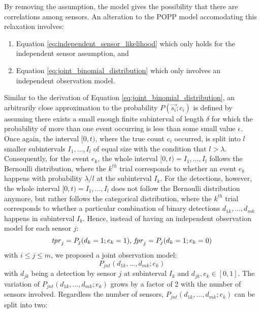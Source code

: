 By removing the assumption, the model gives the possibility that there are correlations among sensors. An alteration to the POPP model accomodating this relaxation involves:
\begin{enumerate}
    \item Equation \ref{eq:independent_sensor_likelihood} which only holds for the independent sensor assumption, and
    \item Equation \ref{eq:joint_binomial_distribution} which only involves an independent observation model.
\end{enumerate}

Similar to the derivation of Equation \ref{eq:joint_binomial_distribution}, an arbitrarily close approximation to the probability $P(\overrightarrow{s_i} ; c_i)$ is defined by assuming there exists a small enough finite subinterval of length $\delta$ for which the probability of more than one event occurring is less than some small value $ \epsilon$. Once again, the interval $[0, t)$, where the true count $c_i$ occurred, is split into $l$ smaller subintervals $I_1, \ldots, I_l$ of equal size with the condition that $l > \lambda$. Consequently, for the event $e_k$, the whole interval $[0, t) = I_1, \ldots, I_l$ follows the Bernoulli distribution, where the $k^{th}$ trial corresponds to whether an event $e_k$ happens with probability $\lambda / l$ at the subinterval $I_k$. For the detections, however, the whole interval $[0, t) = I_1, \ldots, I_l$ does not follow the Bernoulli distribution anymore, but rather follows the categorical distribution, where the $k^{th}$ trial corresponds to whether a particular combination of binary detections $d_{1k}, \ldots, d_{mk}$ happens in subinterval $I_k$.
Hence, instead of having an independent observation model for each sensor $j$:
\begin{equation*}
    \textrm{\textit{tpr}}_j = P_j(d_k = 1 ; e_k = 1) \textrm{, } \textrm{\textit{fpr}}_j = P_j(d_k=1 ; e_k=0)
\end{equation*}
\noindent with $i \leq j \leq m$, we proposed a joint observation model:
\begin{equation}
    \label{eq:joint_sensor_model}
    P_{jnt}(d_{1k}, \ldots, d_{mk} ; e_k)
\end{equation}    
\noindent with $d_{jk}$ being a detection by sensor $j$ at subinterval $I_k$ and $d_{jk}, e_k \in [0, 1]$. The variation of $P_{jnt}(d_{1k}, \ldots, d_{mk} ; e_k)$ grows by a factor of 2 with the number of sensors involved. Regardless the number of sensors, $P_{jnt}(d_{1k}, \ldots, d_{mk} ; e_k)$ can be split into two:
